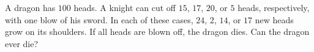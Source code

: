 A dragon has $100$ heads. A knight can cut off $15$, $17$, $20$, or $5$ heads, respectively, with one blow of his sword. In each of these cases, $24$, $2$, $14$, or $17$ new heads grow on its shoulders. If all heads are blown off, the dragon dies. Can the dragon ever die?

